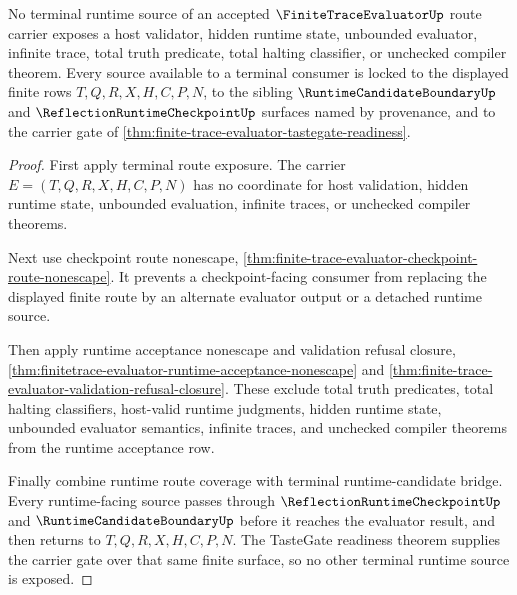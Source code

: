 \begin{theorem}
\label{thm:finite-trace-evaluator-terminal-source-lock}
No terminal runtime source of an accepted $\FiniteTraceEvaluatorUp$ route
carrier exposes a host validator, hidden runtime state, unbounded evaluator,
infinite trace, total truth predicate, total halting classifier, or unchecked
compiler theorem. Every source available to a terminal consumer is locked to
the displayed finite rows $T,Q,R,X,H,C,P,N$, to the sibling
$\RuntimeCandidateBoundaryUp$ and $\ReflectionRuntimeCheckpointUp$ surfaces
named by provenance, and to the carrier gate of
\autoref{thm:finite-trace-evaluator-tastegate-readiness}.
\end{theorem}
\begin{proof}
First apply terminal route exposure. The carrier
$E=(T,Q,R,X,H,C,P,N)$ has no coordinate for host validation, hidden runtime
state, unbounded evaluation, infinite traces, or unchecked compiler theorems.

Next use checkpoint route nonescape,
\autoref{thm:finite-trace-evaluator-checkpoint-route-nonescape}. It prevents a
checkpoint-facing consumer from replacing the displayed finite route by an
alternate evaluator output or a detached runtime source.

Then apply runtime acceptance nonescape and validation refusal closure,
\autoref{thm:finitetrace-evaluator-runtime-acceptance-nonescape} and
\autoref{thm:finite-trace-evaluator-validation-refusal-closure}. These exclude
total truth predicates, total halting classifiers, host-valid runtime
judgments, hidden runtime state, unbounded evaluator semantics, infinite
traces, and unchecked compiler theorems from the runtime acceptance row.

Finally combine runtime route coverage with terminal runtime-candidate bridge.
Every runtime-facing source passes through $\ReflectionRuntimeCheckpointUp$
and $\RuntimeCandidateBoundaryUp$ before it reaches the evaluator result, and
then returns to $T,Q,R,X,H,C,P,N$. The TasteGate readiness theorem supplies the
carrier gate over that same finite surface, so no other terminal runtime
source is exposed.
\end{proof}
